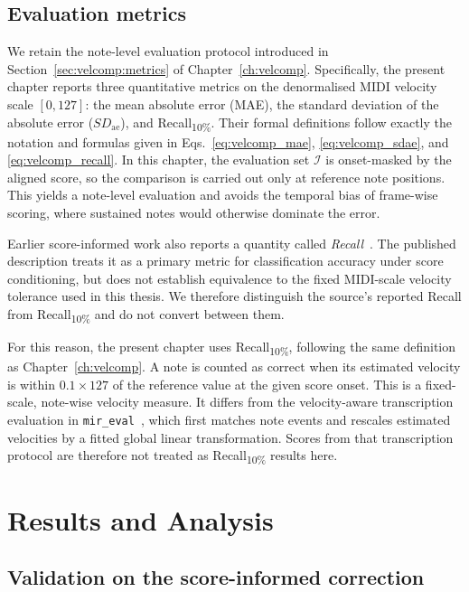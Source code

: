 \subsection{Evaluation metrics}
\label{sec:scoreinf:metrics}

We retain the note-level evaluation protocol introduced in Section~\ref{sec:velcomp:metrics} of Chapter~\ref{ch:velcomp}. Specifically, the present chapter reports three quantitative metrics on the denormalised MIDI velocity scale $[0,127]$: the mean absolute error (MAE), the standard deviation of the absolute error ($SD_{\mathrm{ae}}$), and Recall\textsubscript{10\%}. Their formal definitions follow exactly the notation and formulas given in Eqs.~\eqref{eq:velcomp_mae}, \eqref{eq:velcomp_sdae}, and \eqref{eq:velcomp_recall}. In this chapter, the evaluation set \(\mathcal{I}\) is onset-masked by the aligned score, so the comparison is carried out only at reference note positions. This yields a note-level evaluation and avoids the temporal bias of frame-wise scoring, where sustained notes would otherwise dominate the error.


Earlier score-informed work also reports a quantity called \emph{Recall}~\cite{kim2024method}. The published description treats it as a primary metric for classification accuracy under score conditioning, but does not establish equivalence to the fixed MIDI-scale velocity tolerance used in this thesis. We therefore distinguish the source's reported Recall from Recall\textsubscript{10\%} and do not convert between them.

For this reason, the present chapter uses Recall\textsubscript{10\%}, following the same definition as Chapter~\ref{ch:velcomp}. A note is counted as correct when its estimated velocity is within \(0.1\times127\) of the reference value at the given score onset. This is a fixed-scale, note-wise velocity measure. It differs from the velocity-aware transcription evaluation in \texttt{mir\_eval}~\cite{raffel2014mireval}, which first matches note events and rescales estimated velocities by a fitted global linear transformation. Scores from that transcription protocol are therefore not treated as Recall\textsubscript{10\%} results here.

\section{Results and Analysis}
\label{sec:scoreinf:results}

\subsection{Validation on the score-informed correction}
\label{sec:scoreinf:results:maestro}

